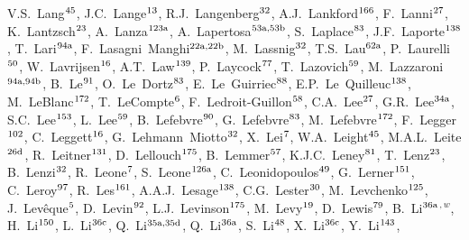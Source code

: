 \begin{flushleft}
V.S.~Lang$^\textrm{\scriptsize 45}$,
J.C.~Lange$^\textrm{\scriptsize 13}$,
R.J.~Langenberg$^\textrm{\scriptsize 32}$,
A.J.~Lankford$^\textrm{\scriptsize 166}$,
F.~Lanni$^\textrm{\scriptsize 27}$,
K.~Lantzsch$^\textrm{\scriptsize 23}$,
A.~Lanza$^\textrm{\scriptsize 123a}$,
A.~Lapertosa$^\textrm{\scriptsize 53a,53b}$,
S.~Laplace$^\textrm{\scriptsize 83}$,
J.F.~Laporte$^\textrm{\scriptsize 138}$,
T.~Lari$^\textrm{\scriptsize 94a}$,
F.~Lasagni~Manghi$^\textrm{\scriptsize 22a,22b}$,
M.~Lassnig$^\textrm{\scriptsize 32}$,
T.S.~Lau$^\textrm{\scriptsize 62a}$,
P.~Laurelli$^\textrm{\scriptsize 50}$,
W.~Lavrijsen$^\textrm{\scriptsize 16}$,
A.T.~Law$^\textrm{\scriptsize 139}$,
P.~Laycock$^\textrm{\scriptsize 77}$,
T.~Lazovich$^\textrm{\scriptsize 59}$,
M.~Lazzaroni$^\textrm{\scriptsize 94a,94b}$,
B.~Le$^\textrm{\scriptsize 91}$,
O.~Le~Dortz$^\textrm{\scriptsize 83}$,
E.~Le~Guirriec$^\textrm{\scriptsize 88}$,
E.P.~Le~Quilleuc$^\textrm{\scriptsize 138}$,
M.~LeBlanc$^\textrm{\scriptsize 172}$,
T.~LeCompte$^\textrm{\scriptsize 6}$,
F.~Ledroit-Guillon$^\textrm{\scriptsize 58}$,
C.A.~Lee$^\textrm{\scriptsize 27}$,
G.R.~Lee$^\textrm{\scriptsize 34a}$,
S.C.~Lee$^\textrm{\scriptsize 153}$,
L.~Lee$^\textrm{\scriptsize 59}$,
B.~Lefebvre$^\textrm{\scriptsize 90}$,
G.~Lefebvre$^\textrm{\scriptsize 83}$,
M.~Lefebvre$^\textrm{\scriptsize 172}$,
F.~Legger$^\textrm{\scriptsize 102}$,
C.~Leggett$^\textrm{\scriptsize 16}$,
G.~Lehmann~Miotto$^\textrm{\scriptsize 32}$,
X.~Lei$^\textrm{\scriptsize 7}$,
W.A.~Leight$^\textrm{\scriptsize 45}$,
M.A.L.~Leite$^\textrm{\scriptsize 26d}$,
R.~Leitner$^\textrm{\scriptsize 131}$,
D.~Lellouch$^\textrm{\scriptsize 175}$,
B.~Lemmer$^\textrm{\scriptsize 57}$,
K.J.C.~Leney$^\textrm{\scriptsize 81}$,
T.~Lenz$^\textrm{\scriptsize 23}$,
B.~Lenzi$^\textrm{\scriptsize 32}$,
R.~Leone$^\textrm{\scriptsize 7}$,
S.~Leone$^\textrm{\scriptsize 126a}$,
C.~Leonidopoulos$^\textrm{\scriptsize 49}$,
G.~Lerner$^\textrm{\scriptsize 151}$,
C.~Leroy$^\textrm{\scriptsize 97}$,
R.~Les$^\textrm{\scriptsize 161}$,
A.A.J.~Lesage$^\textrm{\scriptsize 138}$,
C.G.~Lester$^\textrm{\scriptsize 30}$,
M.~Levchenko$^\textrm{\scriptsize 125}$,
J.~Lev\^eque$^\textrm{\scriptsize 5}$,
D.~Levin$^\textrm{\scriptsize 92}$,
L.J.~Levinson$^\textrm{\scriptsize 175}$,
M.~Levy$^\textrm{\scriptsize 19}$,
D.~Lewis$^\textrm{\scriptsize 79}$,
B.~Li$^\textrm{\scriptsize 36a}$$^{,w}$,
H.~Li$^\textrm{\scriptsize 150}$,
L.~Li$^\textrm{\scriptsize 36c}$,
Q.~Li$^\textrm{\scriptsize 35a,35d}$,
Q.~Li$^\textrm{\scriptsize 36a}$,
S.~Li$^\textrm{\scriptsize 48}$,
X.~Li$^\textrm{\scriptsize 36c}$,
Y.~Li$^\textrm{\scriptsize 143}$,
$$
\end{flushleft}
